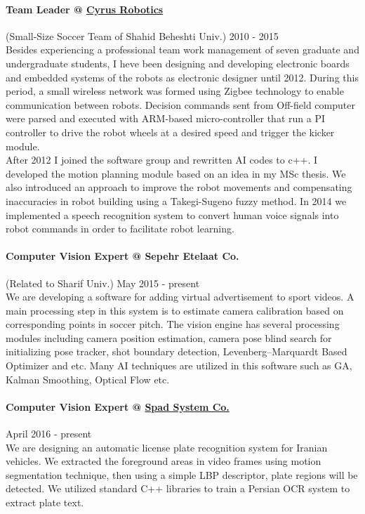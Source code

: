 \documentclass[10pt]{res}
\begin{document}
\begin{resume}
\paragraph{Team Leader @ \href{http://robocup.sbu.ac.ir}{Cyrus Robotics}}(Small-Size Soccer Team of Shahid Beheshti Univ.) \hfill 2010 - 2015\\
Besides experiencing a professional team work management of seven graduate and undergraduate students, I heve been designing and developing electronic boards and embedded systems of the robots as electronic designer until 2012. During this period, a small wireless network was formed using Zigbee technology to enable communication between robots. Decision commands sent from Off-field computer were parsed and executed with ARM-based micro-controller that run a PI controller to  drive the robot wheels at a desired speed and trigger the kicker module.\\
After 2012 I joined the software group and rewritten AI codes to c++. I developed the motion planning module based on an idea in my MSc thesis. We also introduced an approach to improve the robot movements and compensating inaccuracies in robot building using a Takegi-Sugeno fuzzy method.
In 2014 we implemented a speech recognition system to convert human voice signals into robot commands in order to facilitate robot learning.

\paragraph{Computer Vision Expert @ Sepehr Etelaat Co.} (Related to Sharif Univ.) \hfill May 2015 - present\\
We are developing a software for adding virtual advertisement to sport videos. A main processing step in this system is to estimate camera calibration based on corresponding points in soccer pitch. The vision engine has several processing modules including camera position estimation, camera pose blind search for initializing pose tracker, shot boundary detection, Levenberg–Marquardt Based Optimizer and etc. Many AI techniques are utilized in this software such as GA, Kalman Smoothing, Optical Flow etc.

\paragraph{Computer Vision Expert @ \href{http://www.didbaan.com/}{Spad System Co.} } \hfill April 2016 - present\\
We are designing an automatic license plate recognition system for Iranian vehicles. We extracted the foreground areas in video frames using motion segmentation technique, then using a simple LBP descriptor, plate regions will be detected. We utilized standard C++ libraries to train a Persian OCR system to extract plate text.



\end{resume}
\end{document}
